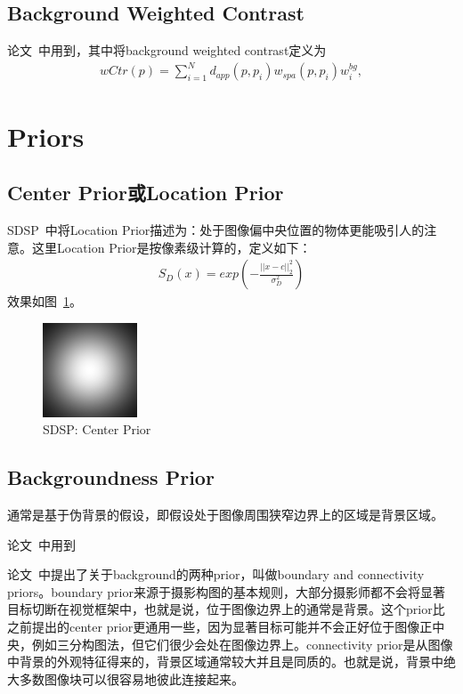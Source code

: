 \documentclass[12pt]{article}
\begin{document}
\subsection{Background Weighted Contrast}

论文~\cite{zhu2014saliency}中用到，其中将background weighted contrast定义为
\begin{align}
wCtr(p) = \sum_{i=1}^{N}d_{app}(p, p_i)w_{spa}(p, p_i)w_i^{bg},
\end{align}

\section{Priors}

\subsection{Center Prior或Location Prior}

SDSP~\cite{zhang2013sdsp}中将Location Prior描述为：处于图像偏中央位置的物体更能吸引人的注意。这里Location Prior是按像素级计算的，定义如下：
\begin{align}
S_D(x) = exp\left(-\frac{||x-c||_2^2}{\sigma_D^2}\right)
\end{align}
效果如图~\ref{fig: SDSPCenterPrior}。
\begin{figure}[!ht]
\centering
\includegraphics[width=0.25\textwidth]{SDSPCenterPrior.png}
\caption{SDSP: Center Prior}
\label{fig: SDSPCenterPrior}
\end{figure} 

\subsection{Backgroundness Prior}

通常是基于伪背景的假设，即假设处于图像周围狭窄边界上的区域是背景区域。

论文~\cite{lu2014learning}中用到

论文~\cite{wei2012geodesic}中提出了关于background的两种prior，叫做boundary and connectivity priors。boundary prior来源于摄影构图的基本规则，大部分摄影师都不会将显著目标切断在视觉框架中，也就是说，位于图像边界上的通常是背景。这个prior比之前提出的center prior更通用一些，因为显著目标可能并不会正好位于图像正中央，例如三分构图法，但它们很少会处在图像边界上。connectivity prior是从图像中背景的外观特征得来的，背景区域通常较大并且是同质的。也就是说，背景中绝大多数图像块可以很容易地彼此连接起来。
\end{document}

